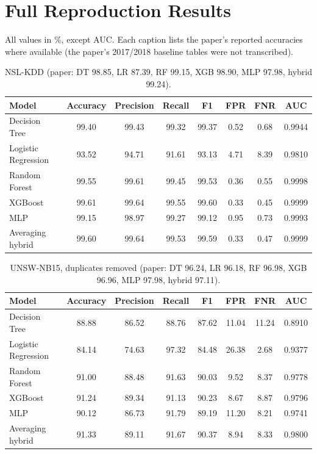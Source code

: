 \documentclass[11pt,a4paper]{article}
\begin{document}
\appendix
\section{Full Reproduction Results}
\label{app:full}
All values in \%, except AUC. Each caption lists the paper's reported accuracies where available (the paper's
2017/2018 baseline tables were not transcribed).

\newcommand{\fulltable}[2]{%
\begin{table}[H]\centering\caption{#1}\small
\begin{tabular}{lccccccc}\toprule
Model & Accuracy & Precision & Recall & F1 & FPR & FNR & AUC \\\midrule
#2
\bottomrule\end{tabular}\end{table}}

\fulltable{NSL-KDD (paper: DT 98.85, LR 87.39, RF 99.15, XGB 98.90, MLP 97.98, hybrid 99.24).}{%
Decision Tree       & 99.40 & 99.43 & 99.32 & 99.37 & 0.52 & 0.68 & 0.9944 \\
Logistic Regression & 93.52 & 94.71 & 91.61 & 93.13 & 4.71 & 8.39 & 0.9810 \\
Random Forest       & 99.55 & 99.61 & 99.45 & 99.53 & 0.36 & 0.55 & 0.9998 \\
XGBoost             & 99.61 & 99.64 & 99.55 & 99.60 & 0.33 & 0.45 & 0.9999 \\
MLP                 & 99.15 & 98.97 & 99.27 & 99.12 & 0.95 & 0.73 & 0.9993 \\
Averaging hybrid    & 99.60 & 99.64 & 99.53 & 99.59 & 0.33 & 0.47 & 0.9999 \\}

\fulltable{UNSW-NB15, duplicates removed (paper: DT 96.24, LR 96.18, RF 96.98, XGB 96.96, MLP 97.98, hybrid 97.11).}{%
Decision Tree       & 88.88 & 86.52 & 88.76 & 87.62 & 11.04 & 11.24 & 0.8910 \\
Logistic Regression & 84.14 & 74.63 & 97.32 & 84.48 & 26.38 & 2.68  & 0.9377 \\
Random Forest       & 91.00 & 88.48 & 91.63 & 90.03 & 9.52  & 8.37  & 0.9778 \\
XGBoost             & 91.24 & 89.34 & 91.13 & 90.23 & 8.67  & 8.87  & 0.9796 \\
MLP                 & 90.12 & 86.73 & 91.79 & 89.19 & 11.20 & 8.21  & 0.9741 \\
Averaging hybrid    & 91.33 & 89.11 & 91.67 & 90.37 & 8.94  & 8.33  & 0.9800 \\}
\end{document}

